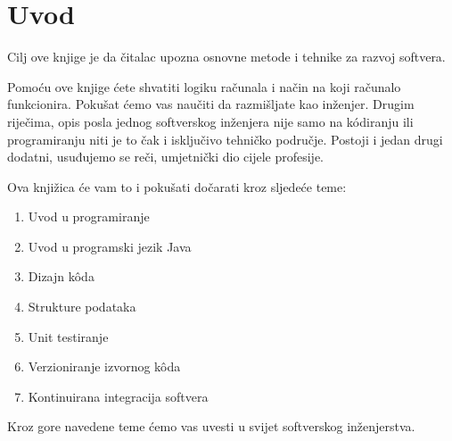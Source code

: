 \chapter*{Uvod}
Cilj ove knjige je da čitalac upozna osnovne metode i tehnike za razvoj softvera.

Pomoću ove knjige ćete shvatiti logiku računala i način na koji računalo funkcionira. Pokušat ćemo vas naučiti da razmišljate kao inženjer. Drugim riječima, opis posla jednog softverskog inženjera nije samo na kódiranju ili programiranju niti je to čak i isključivo tehničko područje. Postoji i jedan drugi dodatni, usuđujemo se reči, umjetnički dio cijele profesije.

Ova knjižica će vam to i pokušati dočarati kroz sljedeće teme:

\begin{enumerate}
    \item Uvod u programiranje
    \item Uvod u programski jezik Java
    \item Dizajn kôda
    \item Strukture podataka
    \item Unit testiranje
    \item Verzioniranje izvornog kôda
    \item Kontinuirana integracija softvera
\end{enumerate}

Kroz gore navedene teme ćemo vas uvesti u svijet softverskog inženjerstva.